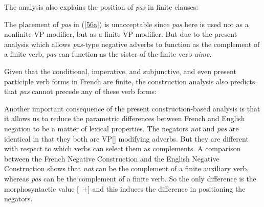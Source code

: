 \documentclass[output=paper]{langsci/langscibook}
\begin{document}
{\begin{exe}
\begin{xlist}
\begin{exe}
\begin{xlist}
The analysis also explains the position of \emph{pas} in
finite clauses:

\eal
{} \label{56a}
\zl

\noindent
The placement of \emph{pas} in (\ref{56a}) is unacceptable since
\emph{pas} here is used not as a nonfinite VP modifier, but as
a finite VP modifier. But due to the
present analysis which allows \textit{pas}-type negative adverbs
to function as the complement of a finite verb,
\emph{pas} can function as
the sister of the finite verb
\emph{aime}.

Given that the conditional, imperative, and subjunctive,
and even present participle verb forms in French are finite, the
construction
analysis also predicts that \emph{pas} cannot precede any of these verb
forms:


\eal
{}
\zl

\eal
{}
\zl

\eal
{}
\zl

\eal
{}
\zl


Another important consequence of the present construction-based analysis
is that it allows us to reduce the parametric differences between
French and English negation to be a matter of lexical properties.
The negators \emph{not} and \emph{pas} are identical in that they both are
VP[] modifying adverbs. But they are different with respect to
which verbs can select them as complements.
A comparison between the French Negative Construction and
the English  Negative Construction shows that \emph{not} can be the
complement of a finite auxiliary verb, whereas \emph{pas} can be the
complement of a finite verb.  So the only difference
is the morphosyntactic value [\AUX\ $+$] and this induces
the difference in positioning the negators.


\end{xlist}
\end{exe}
\end{xlist}
\end{exe}}
\end{document}
